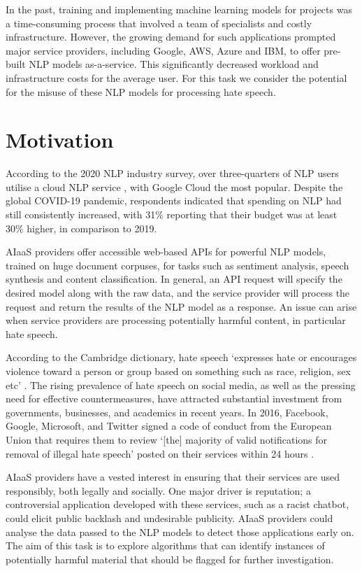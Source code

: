 \documentclass[a4paper,12pt]{report}
\begin{document}
In the past, training and implementing machine learning models for projects was a time-consuming process that involved a team of specialists and costly infrastructure. However, the growing demand for such applications prompted major service providers, including Google, AWS, Azure and IBM, to offer pre-built NLP models as-a-service. This significantly decreased workload and infrastructure costs for the average user. For this task we consider the potential for the misuse of these NLP models for processing hate speech.

\section{Motivation}
According to the 2020 NLP industry survey, over three-quarters of NLP users utilise a cloud NLP service \cite{2020NLPS66:online}, with Google Cloud the most popular. Despite the global COVID-19 pandemic, respondents indicated that spending on NLP had still consistently increased, with 31\% reporting that their budget was at least 30\% higher, in comparison to 2019. 

AIaaS providers offer accessible web-based APIs for powerful NLP models, trained on huge document corpuses, for tasks such as sentiment analysis, speech synthesis and content classification. In general, an API request will specify the desired model along with the raw data, and the service provider will process the request and return the results of the NLP model as a response. An issue can arise when service providers are processing potentially harmful content, in particular hate speech.

According to the Cambridge dictionary, hate speech ‘expresses hate or encourages violence toward a person or group based on something such as race, religion, sex etc’ \cite{HATESPEE16:online}. The rising prevalence of hate speech on social media, as well as the pressing need for effective countermeasures, have attracted substantial investment from governments, businesses, and academics in recent years. In 2016, Facebook, Google, Microsoft, and Twitter signed a code of conduct from the European Union that requires them to review ‘[the] majority of valid notifications for removal of illegal hate speech’ posted on their services within 24 hours \cite{hern2016facebook}.

AIaaS providers have a vested interest in ensuring that their services are used responsibly, both legally and socially. One major driver is reputation; a controversial application developed with these services, such as a racist chatbot, could elicit public backlash and undesirable publicity. AIaaS providers could analyse the data passed to the NLP models to detect those applications early on. The aim of this task is to explore algorithms that can identify instances of potentially harmful material that should be flagged for further investigation.
\end{document}
